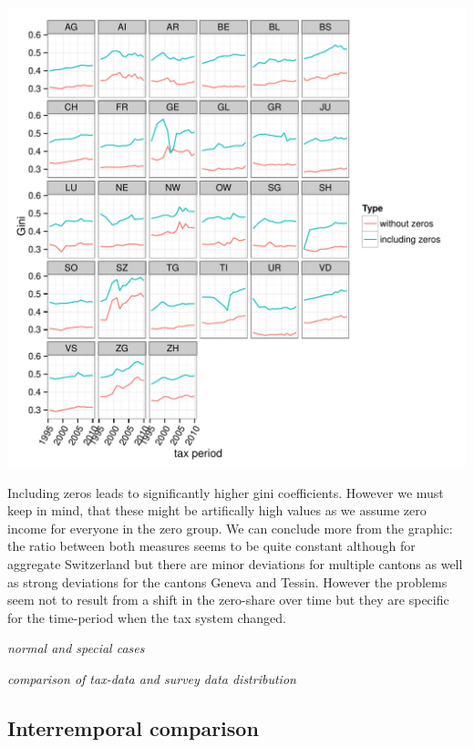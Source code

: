 \documentclass[twoside]{article}\usepackage[]{graphicx}\usepackage[]{color}
\makeatletter
\def\maxwidth{ %
  \ifdim\Gin@nat@width>\linewidth
    \linewidth
  \else
    \Gin@nat@width
  \fi
}
\newenvironment{knitrout}{}{} %
\makeatother
\begin{document}
\begin{multicols}{2}
\begin{knitrout}
\includegraphics[width=\maxwidth]{figure/with_without_zeros2} 

\end{knitrout}


Including zeros leads to significantly higher gini coefficients. However we must keep in mind, that these might be artifically high values as we assume zero income for everyone in the zero group. We can conclude more from the graphic: the ratio between both measures seems to be quite constant although for aggregate Switzerland but there are minor deviations for multiple cantons as well as strong deviations for the cantons Geneva and Tessin. However the problems seem not to result from a shift in the zero-share over time but they are specific for the time-period when the tax system changed. 

\emph{normal and special cases}

\emph{comparison of tax-data and survey data distribution}


\subsection{Interremporal comparison}








\end{multicols}
\end{document}

